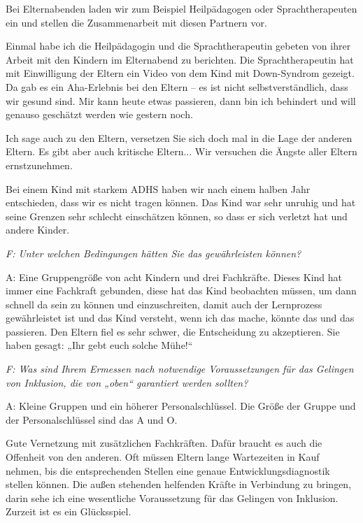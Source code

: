 \begin{linenumbers*}
Bei Elternabenden laden wir zum Beispiel Heilpädagogen oder Sprachtherapeuten ein und stellen die Zusammenarbeit mit diesen Partnern vor.  

Einmal habe ich die Heilpädagogin und die Sprachtherapeutin gebeten von ihrer Arbeit mit den Kindern im Elternabend zu berichten. Die Sprachtherapeutin hat mit Einwilligung der Eltern ein Video von dem Kind mit Down-Syndrom gezeigt. Da gab es ein Aha-Erlebnis bei den Eltern -- es ist nicht selbstverständlich, dass wir gesund sind. Mir kann heute etwas passieren, dann bin ich behindert und will genauso geschätzt werden wie gestern noch.

Ich sage auch zu den Eltern, versetzen Sie sich doch mal in die Lage der anderen Eltern. Es gibt aber auch kritische Eltern... Wir versuchen die Ängste aller Eltern ernstzunehmen. 

Bei einem Kind mit starkem ADHS haben wir nach einem halben Jahr entschieden, dass wir es nicht tragen können. Das Kind war sehr unruhig und hat seine Grenzen sehr schlecht einschätzen können, so dass er sich verletzt hat und andere Kinder.  
	
\emph{F: Unter welchen Bedingungen hätten Sie das gewährleisten können?}

A: Eine Gruppengröße von acht Kindern und drei Fachkräfte. Dieses Kind hat immer eine Fachkraft gebunden, diese hat das Kind beobachten müssen, um dann schnell da sein zu können und einzuschreiten, damit auch der Lernprozess gewährleistet ist und das Kind versteht, wenn ich das mache, könnte das und das passieren. Den Eltern fiel es sehr schwer, die Entscheidung zu akzeptieren. Sie haben gesagt: „Ihr gebt euch solche Mühe!“  

\emph{F: Was sind Ihrem Ermessen nach notwendige Voraussetzungen für das Gelingen von Inklusion, die von „oben“ garantiert werden sollten?} 

A: Kleine Gruppen und ein höherer Personalschlüssel. Die Größe der Gruppe und der Personalschlüssel sind das A und O.  

Gute Vernetzung mit zusätzlichen Fachkräften. Dafür braucht es auch die Offenheit von den anderen. Oft müssen Eltern lange Wartezeiten in Kauf nehmen, bis die entsprechenden Stellen eine genaue Entwicklungsdiagnostik stellen können. Die außen stehenden helfenden Kräfte in Verbindung zu bringen, darin sehe ich eine wesentliche Voraussetzung für das Gelingen von Inklusion. Zurzeit ist es ein Glücksspiel.  


\end{linenumbers*}
